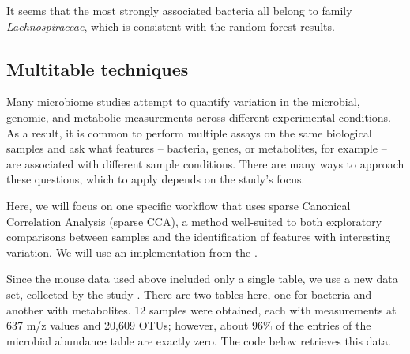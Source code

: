 It seems that the most strongly associated bacteria all belong to
family \emph{Lachnospiraceae}, which is consistent with the random forest
results.

\subsection*{Multitable techniques}

Many microbiome studies attempt to quantify variation in the
microbial, genomic, and metabolic measurements across different
experimental conditions. As a result, it is common to perform multiple
assays on the same biological samples and ask what features -- bacteria,
genes, or metabolites, for example -- are associated with different sample
conditions. There are many ways to approach these questions, which to
apply depends on the study's focus.

Here, we will focus on one specific workflow that uses sparse
Canonical Correlation Analysis (sparse CCA), a method well-suited to
both exploratory comparisons between samples and the identification of
features with interesting variation. We will use an implementation
from the   \cite{witten2009pma}.

Since the mouse data used above included only a single table, we use a
new data set, collected by the study
\cite{kashyap2013genetically}. There are two tables here, one for
bacteria and another with metabolites. 12 samples were obtained, each
with measurements at 637 m/z values and 20,609 OTUs; however, about
96\% of the entries of the microbial abundance table are exactly
zero. The code below retrieves this data.

\begin{knitrout}
\color{fgcolor}\begin{kframe}
\begin{alltt}
\hlstd{(}\hlstd{(}\hlstd{,} \hlstd{,} \hlstd{,} \hlstd{,} \hlstd{,}
                \hlstd{,} \hlstd{))}

 \hlkwb{<-} 
 \hlkwb{<-} 
 \hlkwb{<-}   \hlstd{=} \hlstd{)}
 \hlkwb{<-} 
 \hlkwb{<-} \hlstd{(}
\end{alltt}
\end{kframe}
\end{knitrout}


